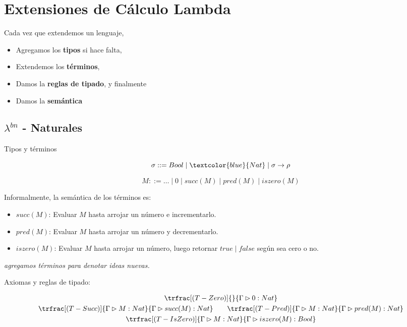 \documentclass{report}
\theoremstyle{definition} %
\newcommand{\tfunc}[2]{#1 \to #2}
\newcommand{\tipa}[3]{#1 \rhd #2 : #3} %
\newcommand{\Gtipa}[2]{\tipa{\Gamma}{#1}{#2}}
\newcommand{\lambdabn}{\lambda^{bn}}
\newcommand{\suc}[1]{succ(#1)}
\newcommand{\pred}[1]{pred(#1)}
\newcommand{\iszero}[1]{iszero(#1)}
\newcommand{\deriv}[3]{\trfrac[(#1)]{#2}{#3}}
\begin{document}
\section{Extensiones de Cálculo Lambda}

Cada vez que extendemos un lenguaje,

\begin{itemize}
    \item Agregamos los \textbf{tipos} si hace falta,
    \item Extendemos los \textbf{términos},
    \item Damos la \textbf{reglas de tipado}, y finalmente
    \item Damos la \textbf{semántica}
\end{itemize}

\subsection{$\lambdabn$ - Naturales}

Tipos y términos

\[
\sigma ::= Bool \mid \textcolor{blue}{Nat} \mid \tfunc{\sigma}{\rho}
\]

\[
M ::= \dots \mid 0 \mid \suc{M} \mid \pred{M} \mid \iszero{M}
\]

Informalmente, la semántica de los términos es:

\begin{itemize}
    \item $\suc{M}$: Evaluar $M$ hasta arrojar un número e incrementarlo.
    \item $\pred{M}$: Evaluar $M$ hasta arrojar un número y decrementarlo.
    \item $\iszero{M}$: Evaluar $M$ hasta arrojar un número, luego retornar
    $true\mid false$ según sea cero o no.
\end{itemize}

\textit{agregamos términos para denotar ideas nuevas.}

Axiomas y reglas de tipado:

\begin{gather*}
    \deriv{T-Zero}
    {}
    {\Gtipa{0}{Nat}}\\
    \deriv{T-Succ}
        {\Gtipa{M}{Nat}}
        {\Gtipa{\suc{M}}{Nat}}
    \qquad
    \deriv{T-Pred}
        {\Gtipa{M}{Nat}}
        {\Gtipa{\pred{M}}{Nat}}\\
    \deriv{T-IsZero}
        {\Gtipa{M}{Nat}}
        {\Gtipa{\iszero{M}}{Bool}}
\end{gather*}
\end{document}
